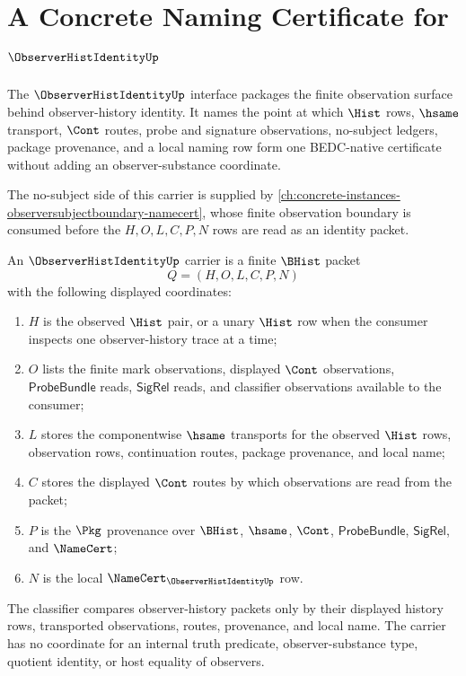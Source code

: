 \chapter{A Concrete Naming Certificate for $\ObserverHistIdentityUp$}
\label{ch:concrete-instances-observerhistidentity-namecert}

The $\ObserverHistIdentityUp$ interface packages the finite observation surface behind observer-history identity. It names the point at which $\Hist$ rows, $\hsame$ transport, $\Cont$ routes, probe and signature observations, no-subject ledgers, package provenance, and a local naming row form one BEDC-native certificate without adding an observer-substance coordinate.

The no-subject side of this carrier is supplied by \autoref{ch:concrete-instances-observersubjectboundary-namecert}, whose finite observation boundary is consumed before the $H,O,L,C,P,N$ rows are read as an identity packet.

\begin{definition}\label{def:observer-hist-identity-carrier}
An $\ObserverHistIdentityUp$ carrier is a finite $\BHist$ packet
$$
Q=(H,O,L,C,P,N)
$$
with the following displayed coordinates:
\begin{enumerate}
\item $H$ is the observed $\Hist$ pair, or a unary $\Hist$ row when the consumer inspects one observer-history trace at a time;
\item $O$ lists the finite mark observations, displayed $\Cont$ observations, $\mathsf{ProbeBundle}$ reads, $\mathsf{SigRel}$ reads, and classifier observations available to the consumer;
\item $L$ stores the componentwise $\hsame$ transports for the observed $\Hist$ rows, observation rows, continuation routes, package provenance, and local name;
\item $C$ stores the displayed $\Cont$ routes by which observations are read from the packet;
\item $P$ is the $\Pkg$ provenance over $\BHist$, $\hsame$, $\Cont$, $\mathsf{ProbeBundle}$, $\mathsf{SigRel}$, and $\NameCert$;
\item $N$ is the local $\NameCert_{\ObserverHistIdentityUp}$ row.
\end{enumerate}
The classifier compares observer-history packets only by their displayed history rows, transported observations, routes, provenance, and local name. The carrier has no coordinate for an internal truth predicate, observer-substance type, quotient identity, or host equality of observers.
\end{definition}

